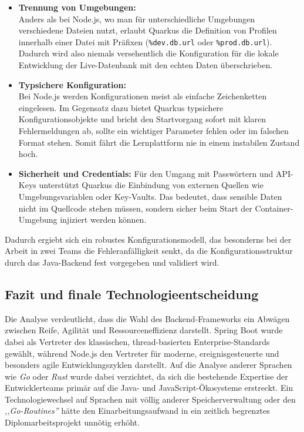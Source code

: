 \begin{itemize}
	\item \textbf{Trennung von Umgebungen:} \\
	Anders als bei Node.js, wo man für unterschiedliche Umgebungen verschiedene Dateien nutzt, erlaubt Quarkus die Definition von Profilen innerhalb einer Datei mit Präfixen (\texttt{\%dev.db.url} oder \texttt{\%prod.db.url}). Dadurch wird also niemals versehentlich die Konfiguration für die lokale Entwicklung der Live-Datenbank mit den echten Daten überschrieben.
	
	\item \textbf{Typsichere Konfiguration:}  \\
	Bei Node.js werden Konfigurationen meist als einfache Zeichenketten eingelesen. Im Gegensatz dazu bietet Quarkus typsichere Konfigurationsobjekte und bricht den Startvorgang sofort mit klaren Fehlermeldungen ab, sollte ein wichtiger Parameter fehlen oder im falschen Format stehen. Somit fährt die Lernplattform nie in einem instabilen Zustand hoch.
	
	\item \textbf{Sicherheit und Credentials:} 
	Für den Umgang mit Passwörtern und API-Keys unterstützt Quarkus die Einbindung von externen Quellen wie Umgebungsvariablen oder Key-Vaults. Das bedeutet, dass sensible Daten nicht im Quellcode stehen müssen, sondern sicher beim Start der Container-Umgebung injiziert werden können.
\end{itemize}

Dadurch ergiebt sich ein robustes Konfigurationsmodell, das besonderns bei der Arbeit in zwei Teams die Fehleranfälligkeit senkt, da die Konfigurationsstruktur durch das Java-Backend fest vorgegeben und validiert wird.


\subsection{Fazit und finale Technologieentscheidung} 
Die Analyse verdeutlicht, dass die Wahl des Backend-Frameworks ein Abwägen zwischen Reife, Agilität und Ressourceneffizienz darstellt. Spring Boot wurde dabei als Vertreter des klassischen, thread-basierten Enterprise-Standards gewählt, während Node.js den Vertreter für moderne, ereignisgesteuerte und besonders agile Entwicklungszyklen darstellt. Auf die Analyse anderer Sprachen wie \textit{Go} oder \textit{Rust} wurde dabei verzichtet, da sich die bestehende Expertise der Entwicklerteams primär auf die Java- und JavaScript-Ökosysteme erstreckt. Ein Technologiewechsel auf Sprachen mit völlig anderer Speicherverwaltung oder den \textit{,,Go-Routines''} hätte den Einarbeitungsaufwand in ein zeitlich begrenztes Diplomarbeitsprojekt unnötig erhöht. 

